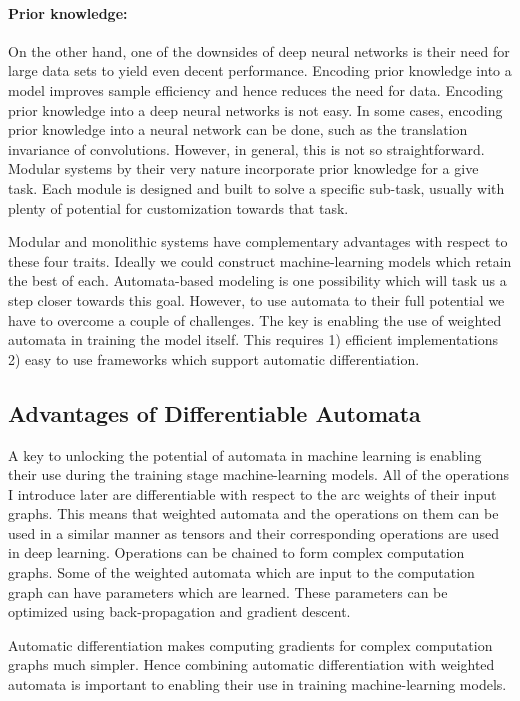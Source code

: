 \paragraph{Prior knowledge:} On the other hand, one of the downsides of deep
neural networks is their need for large data sets to yield even decent
performance. Encoding prior knowledge into a model improves sample efficiency
and hence reduces the need for data. Encoding prior knowledge into a deep
neural networks is not easy. In some cases, encoding prior knowledge into a
neural network can be done, such as the translation invariance of convolutions.
However, in general, this is not so straightforward. Modular systems by their
very nature incorporate prior knowledge for a give task. Each module is
designed and built to solve a specific sub-task, usually with plenty of
potential for customization towards that task.

Modular and monolithic systems have complementary advantages with respect to
these four traits. Ideally we could construct machine-learning models which
retain the best of each. Automata-based modeling is one possibility which will
task us a step closer towards this goal.  However, to use automata to their
full potential we have to overcome a couple of challenges. The key is enabling
the use of weighted automata in training the model itself. This requires 1)
efficient implementations 2) easy to use frameworks which support automatic
differentiation.

\subsection{Advantages of Differentiable Automata}
\label{sec:advantages}

A key to unlocking the potential of automata in machine learning is enabling
their use during the training stage machine-learning models. All of the
operations I introduce later are differentiable with respect to the arc weights
of their input graphs. This means that weighted automata and the operations on
them can be used in a similar manner as tensors and their corresponding
operations are used in deep learning. Operations can be chained to form complex
computation graphs. Some of the weighted automata which are input to the
computation graph can have parameters which are learned. These parameters can
be optimized using back-propagation and gradient descent.

Automatic differentiation makes computing gradients for complex computation
graphs much simpler. Hence combining automatic differentiation with weighted
automata is important to enabling their use in training machine-learning
models.

